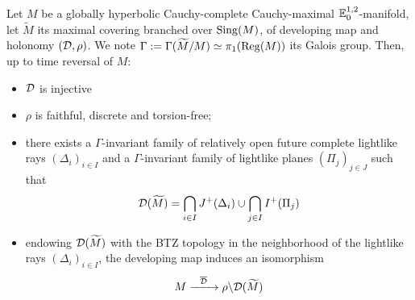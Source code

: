 \begin{thm} Let $M$ be a globally hyperbolic Cauchy-complete Cauchy-maximal ${\mathbb E}^{1,2}_{0}$-manifold, let $\widetilde M$ its maximal covering branched over $\mathrm{Sing}(M)$, of  developing map and holonomy  $(\mathcal{D},\rho)$. We note $\Gamma:=\Gamma(\widetilde M/M)\simeq\pi_1(\mathrm{Reg}(M))$ its Galois group.  Then, up to time reversal of $M$:
\begin{itemize}
 \item $\mathcal{D}$ is injective
 \item $\rho$ is faithful, discrete and torsion-free; 
 \item there exists a $\Gamma$-invariant family of relatively open future complete lightlike  rays $(\Delta_i)_{i\in I}$ and a $\Gamma$-invariant family of lightlike planes $(\Pi_j)_{j\in J}$ such that 
 $$\mathcal{D}(\widetilde M) = \bigcap_{i\in I} J^+(\Delta_i) \cup \bigcap_{j\in I} I^+(\Pi_j) $$
 
 \item endowing $\mathcal{D}(\widetilde M)$ with the BTZ topology in the neighborhood of the lightlike rays $(\Delta_i)_{i\in I}$, the developing map induces an isomorphism
 $$ M\xrightarrow{~~\overline {\mathcal{D}}~~} \rho\backslash\mathcal{D}(\widetilde M
 ) $$
\end{itemize}


\end{thm}
